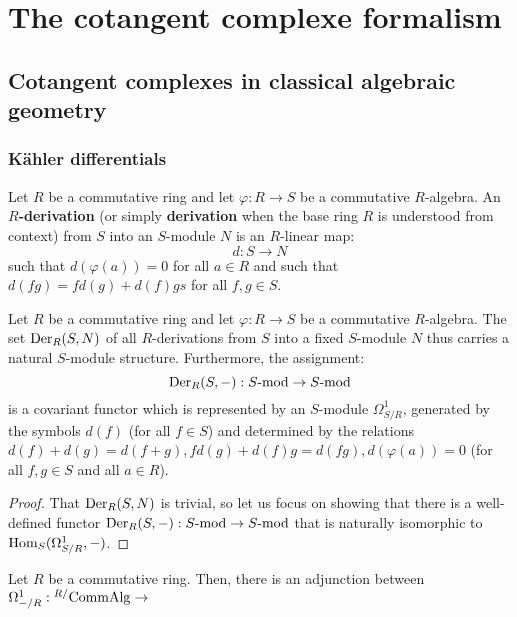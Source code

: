 \section{The cotangent complexe formalism}
    \subsection{Cotangent complexes in classical algebraic geometry}
        \subsubsection{K\"ahler differentials} \label{subsubsection: kahler_differentials}
            \begin{definition} \label{def: kahler_differentials}
                Let $R$ be a commutative ring and let $\varphi: R \to S$ be a commutative $R$-algebra. An \textbf{$R$-derivation} (or simply \textbf{derivation} when the base ring $R$ is understood from context) from $S$ into an $S$-module $N$ is an $R$-linear map:
                    $$d: S \to N$$
                such that $d(\varphi(a)) = 0$ for all $a \in R$ and such that $d(fg) = fd(g) + d(f)gs$ for all $f, g \in S$.
            \end{definition}
            \begin{lemma} \label{lemma: modules_of_derivations}
                Let $R$ be a commutative ring and let $\varphi: R \to S$ be a commutative $R$-algebra. The set $\mathrm{Der}_R(S, N)$ of all $R$-derivations from $S$ into a fixed $S$-module $N$ thus carries a natural $S$-module structure. Furthermore, the assignment:
                    $$\mathrm{Der}_R(S, -): S\text{-}\mathrm{mod} \to S\text{-}\mathrm{mod}$$
                is a covariant functor which is represented by an $S$-module $\Omega^1_{S/R}$, generated by the symbols $d(f)$ (for all $f \in S$) and determined by the relations $d(f) + d(g) = d(f + g), fd(g) + d(f)g = d(fg), d(\varphi(a)) = 0$ (for all $f, g \in S$ and all $a \in R$).
            \end{lemma}
                \begin{proof}
                    That $\mathrm{Der}_R(S, N)$ is trivial, so let us focus on showing that there is a well-defined functor $\mathrm{Der}_R(S, -): S\text{-}\mathrm{mod} \to S\text{-}\mathrm{mod}$ that is naturally isomorphic to $\mathrm{Hom}_S(\Omega^1_{S/R}, -)$. 
                \end{proof}
            \begin{theorem} \label{theorem: kahler_differentials_universal_property}
                Let $R$ be a commutative ring. Then, there is an adjunction between $\Omega^1_{-/R}: {}^{R/}\mathrm{Comm}\mathrm{Alg} \to $ 
            \end{theorem}
            
